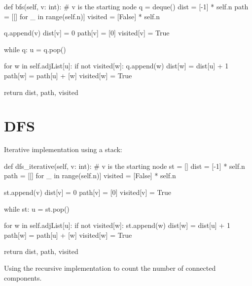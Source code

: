\begin{python}
    def bfs(self, v: int):  # v is the starting node
        q = deque()
        dist = [-1] * self.n
        path = [[] for _ in range(self.n)]
        visited = [False] * self.n

        q.append(v)
        dist[v] = 0
        path[v] = [0]
        visited[v] = True

        while q:
            u = q.pop()

            for w in self.adjList[u]:
                if not visited[w]:
                    q.append(w)
                    dist[w] = dist[u] + 1
                    path[w] = path[u] + [w]
                    visited[w] = True

        return dist, path, visited
\end{python}

\section{DFS}

\noindent Iterative implementation using a stack:

\begin{python}
    def dfs_iterative(self, v: int):  # v is the starting node
        st = []
        dist = [-1] * self.n
        path = [[] for _ in range(self.n)]
        visited = [False] * self.n

        st.append(v)
        dist[v] = 0
        path[v] = [0]
        visited[v] = True

        while st:
            u = st.pop()

            for w in self.adjList[u]:
                if not visited[w]:
                    st.append(w)
                    dist[w] = dist[u] + 1
                    path[w] = path[u] + [w]
                    visited[w] = True

        return dist, path, visited
\end{python}

\noindent Using the recursive implementation to count the number of connected components.

